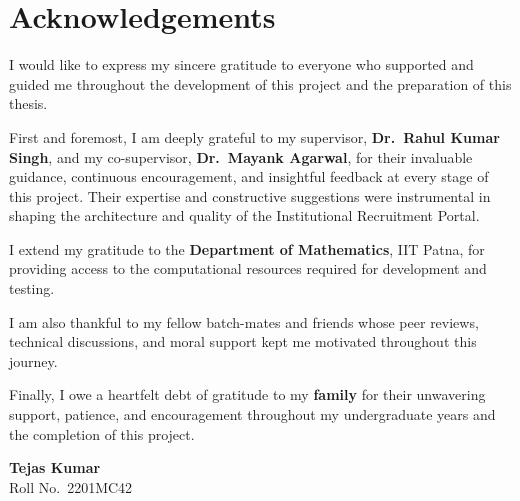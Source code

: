 \chapter*{\centering Acknowledgements}

\quad I would like to express my sincere gratitude to everyone who supported and guided me throughout the development of this project and the preparation of this thesis.

First and foremost, I am deeply grateful to my supervisor, \textbf{Dr.\ Rahul Kumar Singh}, and my co-supervisor, \textbf{Dr.\ Mayank Agarwal}, for their invaluable guidance, continuous encouragement, and insightful feedback at every stage of this project. Their expertise and constructive suggestions were instrumental in shaping the architecture and quality of the Institutional Recruitment Portal.

I extend my gratitude to the \textbf{Department of Mathematics}, IIT Patna, for providing access to the computational resources required for development and testing.

I am also thankful to my fellow batch-mates and friends whose peer reviews, technical discussions, and moral support kept me motivated throughout this journey.

Finally, I owe a heartfelt debt of gratitude to my \textbf{family} for their unwavering support, patience, and encouragement throughout my undergraduate years and the completion of this project.

\vspace{1cm}
\begin{flushright}
\textbf{Tejas Kumar}\\
Roll No.\ 2201MC42\\
\end{flushright}
